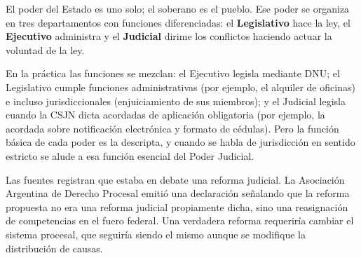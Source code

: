 \documentclass[12pt,oneside]{book}
\begin{document}
El poder del Estado es uno solo; el soberano es el pueblo. Ese poder se organiza en tres departamentos con funciones diferenciadas: el \textbf{Legislativo} hace la ley, el \textbf{Ejecutivo} administra y el \textbf{Judicial} dirime los conflictos haciendo actuar la voluntad de la ley.

En la práctica las funciones se mezclan: el Ejecutivo legisla mediante DNU; el Legislativo cumple funciones administrativas (por ejemplo, el alquiler de oficinas) e incluso jurisdiccionales (enjuiciamiento de sus miembros); y el Judicial legisla cuando la CSJN dicta acordadas de aplicación obligatoria (por ejemplo, la acordada sobre notificación electrónica y formato de cédulas). Pero la función básica de cada poder es la descripta, y cuando se habla de jurisdicción en sentido estricto se alude a esa función esencial del Poder Judicial.

\begin{note}
Las fuentes registran que estaba en debate una reforma judicial. La Asociación Argentina de Derecho Procesal emitió una declaración señalando que la reforma propuesta no era una reforma judicial propiamente dicha, sino una reasignación de competencias en el fuero federal. Una verdadera reforma requeriría cambiar el sistema procesal, que seguiría siendo el mismo aunque se modifique la distribución de causas.
\end{note}
\end{document}
